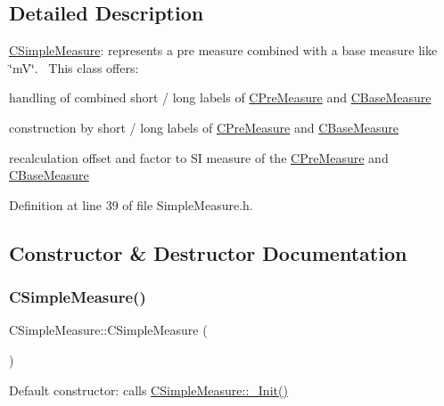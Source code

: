 \subsection{Detailed Description}
\hyperlink{classCSimpleMeasure}{C\+Simple\+Measure}\+: represents a pre measure combined with a base measure like \char`\"{}m\+V\char`\"{}.~\newline
 This class offers\+: 


\begin{DoxyItemize}
\item handling of combined short / long labels of \hyperlink{classCPreMeasure}{C\+Pre\+Measure} and \hyperlink{classCBaseMeasure}{C\+Base\+Measure}
\item construction by short / long labels of \hyperlink{classCPreMeasure}{C\+Pre\+Measure} and \hyperlink{classCBaseMeasure}{C\+Base\+Measure}
\item recalculation offset and factor to SI measure of the \hyperlink{classCPreMeasure}{C\+Pre\+Measure} and \hyperlink{classCBaseMeasure}{C\+Base\+Measure} 
\end{DoxyItemize}

Definition at line 39 of file Simple\+Measure.\+h.



\subsection{Constructor \& Destructor Documentation}
\mbox{\label{classCSimpleMeasure_ad59772618a763def710ef6e3a8fbcb9f}} 
\subsubsection{\texorpdfstring{C\+Simple\+Measure()}{CSimpleMeasure()}\hspace{0.1cm}{\footnotesize\ttfamily [1/3]}}
{\footnotesize\ttfamily C\+Simple\+Measure\+::\+C\+Simple\+Measure (\begin{DoxyParamCaption}{ }\end{DoxyParamCaption})}



Default constructor\+: calls \hyperlink{classCSimpleMeasure_ada8744ac5a824143904a2ecaef2b0b70}{C\+Simple\+Measure\+::\+\_\+\+Init()} 



